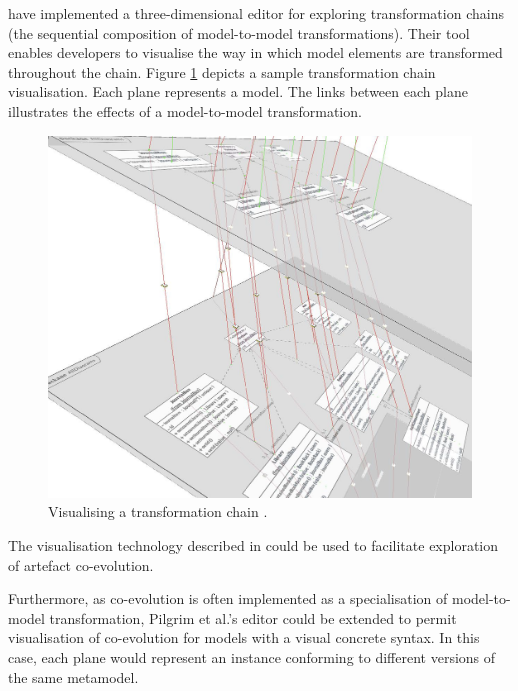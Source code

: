 \cite{pilgrim08constructing} have implemented a three-dimensional editor for exploring transformation chains (the sequential composition of model-to-model transformations). Their tool enables developers to visualise the way in which model elements are transformed throughout the chain. Figure \ref{fig:transformation-chains} depicts a sample transformation chain visualisation. Each plane represents a model. The links between each plane illustrates the effects of a model-to-model transformation.

\begin{figure}[htbp]
  \begin{center}
    \leavevmode
    \includegraphics[scale=0.25]{3.LiteratureReview/images/transformation-chain.png}
  \end{center}
  \caption{Visualising a transformation chain \cite{pilgrim08constructing}.}
  \label{fig:transformation-chains}
\end{figure}

The visualisation technology described in \cite{pilgrim08constructing} could be used to facilitate exploration of artefact co-evolution.

Furthermore, as co-evolution is often implemented as a specialisation of model-to-model transformation, Pilgrim et al.'s editor could be extended to permit visualisation of co-evolution for models with a visual concrete syntax. In this case, each plane would represent an instance conforming to different versions of the same metamodel.



